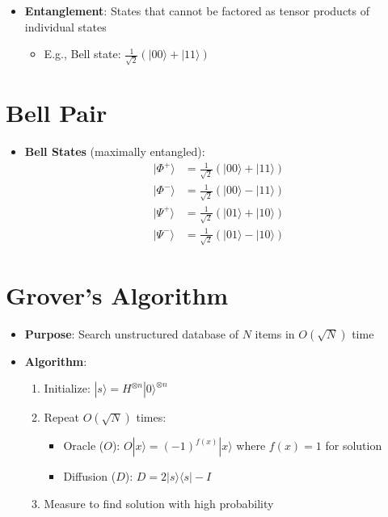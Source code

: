 \begin{multicols}{3}
\begin{itemize}[leftmargin=*,nosep,topsep=0pt]
    \item \textbf{Entanglement}: States that cannot be factored as tensor products of individual states
    \begin{itemize}[nosep]
        \item E.g., Bell state: $\frac{1}{\sqrt{2}}(|00\rangle + |11\rangle)$
    \end{itemize}
\end{itemize}

\section*{Bell Pair}
\begin{itemize}[leftmargin=*,nosep,topsep=0pt]
    \item \textbf{Bell States} (maximally entangled):
    \begin{align*}
        |\Phi^+\rangle &= \frac{1}{\sqrt{2}}(|00\rangle + |11\rangle)\\
        |\Phi^-\rangle &= \frac{1}{\sqrt{2}}(|00\rangle - |11\rangle)\\
        |\Psi^+\rangle &= \frac{1}{\sqrt{2}}(|01\rangle + |10\rangle)\\
        |\Psi^-\rangle &= \frac{1}{\sqrt{2}}(|01\rangle - |10\rangle)
    \end{align*}
\end{itemize}

\section*{Grover's Algorithm}
\begin{itemize}[leftmargin=*,nosep,topsep=0pt]
    \item \textbf{Purpose}: Search unstructured database of $N$ items in $O(\sqrt{N})$ time

    \item \textbf{Algorithm}:
    \begin{enumerate}[nosep]
        \item Initialize: $|s\rangle = H^{\otimes n}|0\rangle^{\otimes n}$
        \item Repeat $O(\sqrt{N})$ times:
        \begin{itemize}[nosep]
            \item Oracle ($O$): $O|x\rangle = (-1)^{f(x)}|x\rangle$ where $f(x)=1$ for solution
            \item Diffusion ($D$): $D = 2|s\rangle\langle s| - I$
        \end{itemize}
        \item Measure to find solution with high probability
    \end{enumerate}
\end{itemize}


\end{multicols}
\endgroup
